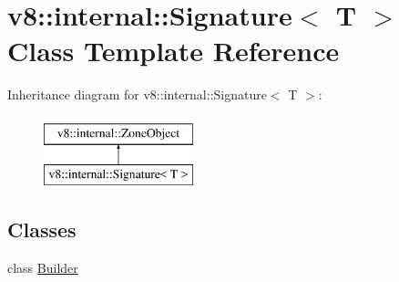 \hypertarget{classv8_1_1internal_1_1Signature}{}\section{v8\+:\+:internal\+:\+:Signature$<$ T $>$ Class Template Reference}
\label{classv8_1_1internal_1_1Signature}
Inheritance diagram for v8\+:\+:internal\+:\+:Signature$<$ T $>$\+:\begin{figure}[H]
\begin{center}
\leavevmode
\includegraphics[height=2.000000cm]{classv8_1_1internal_1_1Signature}
\end{center}
\end{figure}
\subsection*{Classes}
\begin{DoxyCompactItemize}
\item 
class \mbox{\hyperlink{classv8_1_1internal_1_1Signature_1_1Builder}{Builder}}
\end{DoxyCompactItemize}
